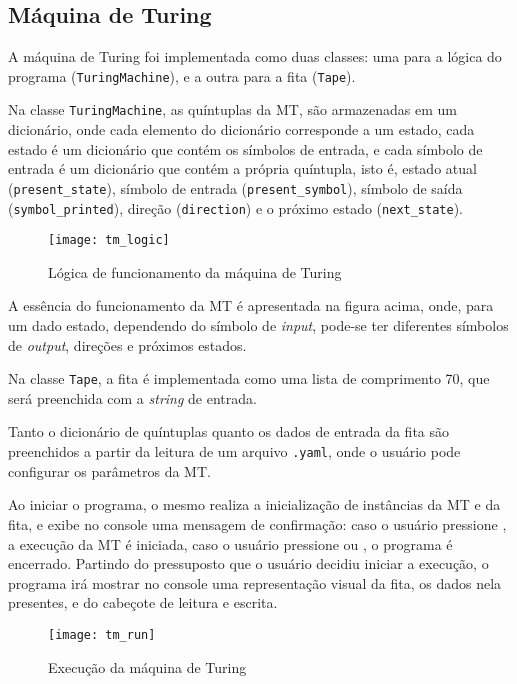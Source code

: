 \subsection{Máquina de Turing}

A máquina de Turing foi implementada como duas classes: uma para a lógica do
programa (\verb|TuringMachine|), e a outra para a fita (\verb|Tape|).

Na classe \verb|TuringMachine|, as quíntuplas da MT, são armazenadas em um
dicionário, onde cada elemento do dicionário corresponde a um estado, cada
estado é um dicionário que contém os símbolos de entrada, e cada símbolo de
entrada é um dicionário que contém a própria quíntupla, isto é, estado atual
(\verb|present_state|), símbolo de entrada (\verb|present_symbol|), símbolo de
saída \linebreak (\verb|symbol_printed|), direção (\verb|direction|) e o próximo
estado (\verb|next_state|).

\begin{figure}[H]
    \centering
    \texttt{[image: tm\_logic]}
    \caption{Lógica de funcionamento da máquina de Turing}
    \label{fig:tm_logic}
\end{figure}

A essência do funcionamento da MT é apresentada na figura acima, onde, para um
dado estado, dependendo do símbolo de \textit{input}, pode-se ter diferentes
símbolos de \textit{output}, direções e próximos estados.

Na classe \verb|Tape|, a fita é implementada como uma lista de comprimento 70,
que será preenchida com a \textit{string} de entrada.

Tanto o dicionário de quíntuplas quanto os dados de entrada da fita são
preenchidos a partir da leitura de um arquivo \verb|.yaml|, onde o usuário pode
configurar os parâmetros da MT.

Ao iniciar o programa, o mesmo realiza a inicialização de instâncias da MT e da
fita, e exibe no console uma mensagem de confirmação: caso o usuário pressione
\keys{\enter}, a execução da MT é iniciada, caso o usuário pressione
\linebreak {} ou , o programa é encerrado. Partindo do
pressuposto que o usuário decidiu iniciar a execução, o programa irá mostrar no
console uma representação visual da fita, os dados nela presentes, e do cabeçote
de leitura e escrita.

\begin{figure}[H]
    \centering
    \texttt{[image: tm\_run]}
    \caption{Execução da máquina de Turing}
    \label{fig:tm_run}
\end{figure}


